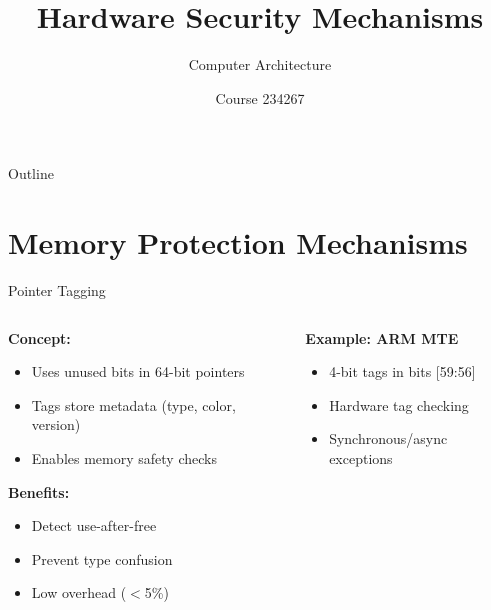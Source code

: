\documentclass[aspectratio=169,12pt]{beamer}
\title{Hardware Security Mechanisms}
\subtitle{Computer Architecture}
\author{Course 234267}
\date{}
\begin{document}
\frame{\titlepage}

\begin{frame}{Outline}
    \tableofcontents
\end{frame}

\section{Memory Protection Mechanisms}

\begin{frame}{Pointer Tagging}
    \begin{columns}
        \begin{column}{0.5\textwidth}
            \textbf{Concept:}
            \begin{itemize}
                \item Uses unused bits in 64-bit pointers
                \item Tags store metadata (type, color, version)
                \item Enables memory safety checks
            \end{itemize}
            
            \vspace{0.5cm}
            \textbf{Benefits:}
            \begin{itemize}
                \item Detect use-after-free
                \item Prevent type confusion
                \item Low overhead ($<$5\%)
            \end{itemize}
        \end{column}
        \begin{column}{0.5\textwidth}
            
            \vspace{0.5cm}
            \textbf{Example: ARM MTE}
            \begin{itemize}
                \item 4-bit tags in bits [59:56]
                \item Hardware tag checking
                \item Synchronous/async exceptions
            \end{itemize}
        \end{column}
    \end{columns}
\end{frame}
\end{document}
